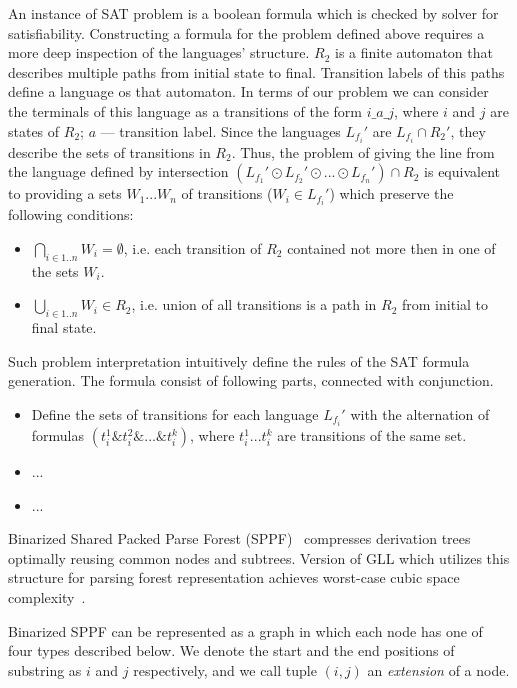 An instance of SAT problem is a boolean formula which is checked by solver for satisfiability. 
Constructing a formula for the problem defined above requires a more deep inspection of the languages' structure.
$R_2$ is a finite automaton that describes multiple paths from initial state to final. Transition labels of 
this paths define a language os that automaton. In terms of our problem we can consider the terminals of this language as 
a transitions of the form $i\_a\_j$, where $i$ and $j$ are states of $R_2$; $a$ --- transition label.
Since the languages $L_{f_i}'$ are $L_{f_i} \cap R_2'$, they describe the sets of transitions in 
$R_2$. Thus, the problem of giving the line from the language defined by intersection $(L_{f_1}' \odot L_{f_2}' \odot... \odot L_{f_n}')\cap R_2$
is equivalent to providing a sets $W_1...W_n$ of transitions ($W_i \in L_{f_i}'$) which preserve the following conditions:
\begin{itemize}
    \item $\bigcap\limits_{i\in 1..n} W_i = \emptyset$, i.e.
    each transition of $R_2$ contained not more then in one of the sets $W_i$.
    \item $\bigcup\limits_{i\in 1..n} W_i \in R_2$, i.e. union of all transitions
    is a path in $R_2$ from initial to final state. 
\end{itemize}
Such problem interpretation intuitively define the rules of the SAT formula generation.
The formula consist of following parts, connected with conjunction.
\begin{itemize}
    \item Define the sets of transitions for each language $L_{f_i}'$ with the alternation
     of formulas $(t_i^1 \& t_i^2 \& ...\& t_i^k)$, where $t_i^1 ... t_i^k$ are transitions of the same set.
    \item ...
    \item ...
\end{itemize}


Binarized Shared Packed Parse Forest (SPPF)~\cite{brnglr} compresses derivation trees optimally reusing common nodes and subtrees.
Version of GLL which utilizes this structure for parsing forest representation achieves worst-case cubic space complexity~\cite{gllParsingTree}.

Binarized SPPF can be represented as a graph in which each node has one of four types described below.
We denote the start and the end positions of substring as $i$ and $j$ respectively, and we call tuple $(i,j)$ an \textit{extension} of a node.

